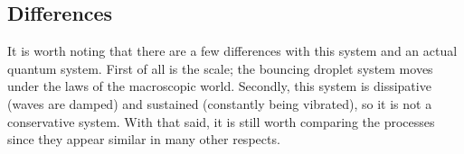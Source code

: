 \subsection{Differences}
It is worth noting that there are a few differences with this system and an actual quantum system. First of all is the scale; the bouncing droplet system moves under the laws of the macroscopic world. Secondly, this system is dissipative (waves are damped) and sustained (constantly being vibrated), so it is not a conservative system. With that said, it is still worth comparing the processes since they appear similar in many other respects.







